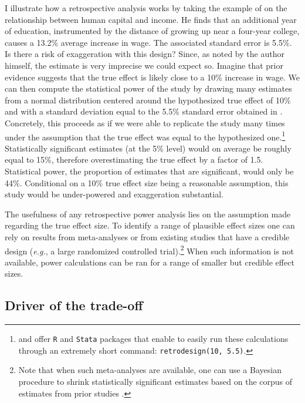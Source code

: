 \documentclass[usletter, 12pt]{article}
\begin{document}
				I illustrate how a retrospective analysis works by taking the example of \cite{card_using_1993} on the relationship between human capital and income. He finds that an additional year of education, instrumented by the distance of growing up near a four-year college, causes a 13.2\% average increase in wage. The associated standard error is 5.5\%. Is there a risk of exaggeration with this design? Since, as noted by the author himself, the estimate is very imprecise we could expect so. Imagine that prior evidence suggests that the true effect is likely close to a 10\% increase in wage. We can then compute the statistical power of the study by drawing many estimates from a normal distribution centered around the hypothesized true effect of 10\% and with a standard deviation equal to the 5.5\% standard error obtained in \cite{card_using_1993}. Concretely, this proceeds as if we were able to replicate the study many times under the assumption that the true effect was equal to the hypothesized one.\footnote{\cite{timm_retrodesign_2019} and \cite{linden_retrodesign_2019} offer \texttt{R} and \texttt{Stata} packages that enable to easily run these calculations through an extremely short command: \texttt{retrodesign(10, 5.5)}.} Statistically significant estimates (at the 5\% level) would on average be roughly equal to 15\%, therefore overestimating the true effect by a factor of 1.5. Statistical power, the proportion of estimates that are significant, would only be 44\%. Conditional on a 10\% true effect size being a reasonable assumption, this study would be under-powered and exaggeration substantial.
			
				The usefulness of any retrospective power analysis lies on the assumption made regarding the true effect size. To identify a range of plausible effect sizes one can rely on results from meta-analyses or from existing studies that have a credible design (\textit{e.g.}, a large randomized controlled trial).\footnote{Note that when such meta-analyses are available, one can use a Bayesian procedure to shrink statistically significant estimates based on the corpus of estimates from prior studies \cite{zwet_proposal_2021, zwet_significance_2021, zwet_statistical_2021} .} When such information is not available, power calculations can be ran for a range of smaller but credible effect sizes.
				
		\subsection{Driver of the trade-off}
		
\end{document}
